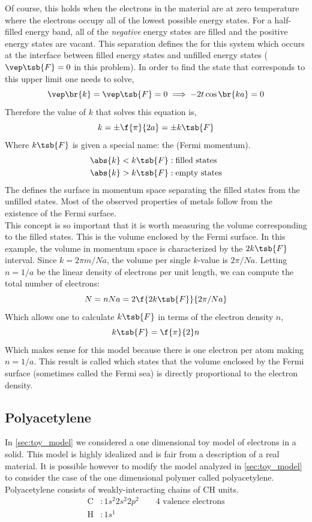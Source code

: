\documentclass{article}
\begin{document}
Of course, this holds when the electrons in the material are at zero temperature where the electrons occupy all of the lowest possible energy states. For a half-filled energy band, all of the \textit{negative} energy states are filled and the positive energy states are vacant. This separation defines the  for this system which occurs at the interface between filled energy states and unfilled energy states ($\vep\tsb{F} = 0$ in this problem). In order to find the state that corresponds to this upper limit one needs to solve,
\[ \vep\br{k} = \vep\tsb{F} = 0 \implies -2t \cos\br{ka} = 0 \]
Therefore the value of $k$ that solves this equation is,
\[  k = \pm \f{\pi}{2a} = \pm k\tsb{F}\]
Where $k\tsb{F}$ is given a special name: the  (Fermi momentum).
\begin{align*}
    \abs{k} < k\tsb{F} &: \text{filled states}\\
    \abs{k} > k\tsb{F} &: \text{empty states}
\end{align*}
The  defines the surface in momentum space separating the filled states from the unfilled states. Most of the observed properties of metals follow from the existence of the Fermi surface. \\

This concept is so important that it is worth measuring the volume  corresponding to the filled states. This is the volume enclosed by the Fermi surface. In this example, the volume in momentum space is characterized by the $2 k\tsb{F}$ interval. Since $k = 2\pi m / Na$, the volume per single $k$-value is $2 \pi / Na$. Letting $n = 1/a$ be the linear density of electrons per unit length, we can compute the total number of electrons:
\[ N =  n N a = 2 \f{2k\tsb{F}}{2 \pi / Na} \]
Which allows one to calculate $k\tsb{F}$ in terms of the electron density $n$,
\[ k\tsb{F} =\f{\pi}{2} n \]
Which makes sense for this model because there is one electron per atom making $n = 1/a$.
This result is called  which states that the volume enclosed by the Fermi surface (sometimes called the Fermi sea) is directly proportional to the electron density. \\

\subsection{Polyacetylene}

In \cref{sec:toy_model} we considered a one dimensional toy model of electrons in a solid. This model is highly idealized and is fair from a description of a real material. It is possible however to modify the model analyzed in \cref{sec:toy_model} to consider the case of the one dimensional polymer called polyacetylene. Polyacetylene consists of weakly-interacting chains of CH units.
\begin{align*}
    \text{C} &: 1s^2 2s^2 2p^2 \qquad \text{4 valence electrons}\\
    \text{H} &: 1s^1
\end{align*}
\end{document}
